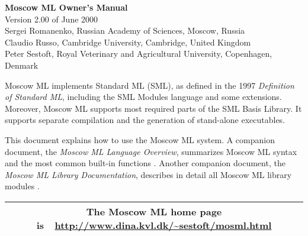 \documentclass[fleqn,a4paper]{article}
\begin{document}
\begin{center}

  {\huge\bf Moscow ML Owner's Manual}\\[0.5cm]

Version 2.00 of June 2000\\[0.5cm]

Sergei Romanenko, Russian Academy of Sciences, Moscow, Russia\\
Claudio Russo, Cambridge University, Cambridge, United Kingdom\\
Peter Sestoft, Royal Veterinary and Agricultural University, 
Copenhagen, Denmark

\end{center}

\vspace{0.5cm}

\noindent 
Moscow ML implements Standard ML (SML), as defined in the 1997 {\em
  Definition of Standard ML\/}, including the SML Modules language
and some extensions.  Moreover, Moscow ML supports most required parts
of the SML Basis Library.  It supports separate compilation and the
generation of stand-alone executables.

This document explains how to use the Moscow ML system.  A companion
document, the {\em Moscow ML Language Overview\/}, summarizes Moscow
ML syntax and the most common built-in functions
\cite{MoscowML:2000:MoscowMLLanguage}.  Another companion document,
the \emph{Moscow ML Library Documentation}, describes in detail all
Moscow ML library modules \cite{MoscowML:2000:MoscowMLLibrary}. 

\vspace{0.5cm}

\tableofcontents

\vfill

\begin{center}
\begin{tabular}{|c|}\hline
\rule[-0.4cm]{0cm}{1cm}The Moscow ML home page is\ \
    \url{http://www.dina.kvl.dk/~sestoft/mosml.html}\\\hline
\end{tabular}
\end{center}
\end{document}
